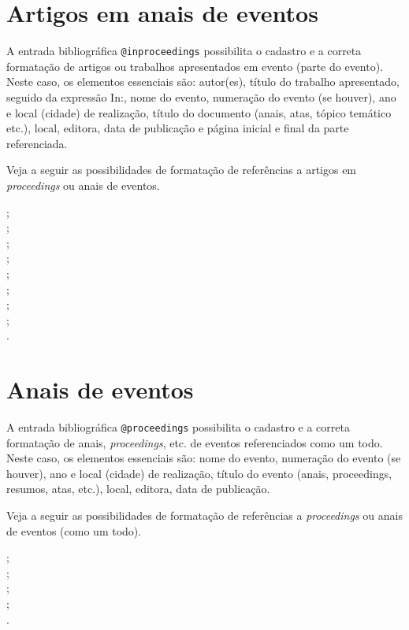 \begin{apendicesenv}
\section{Artigos em anais de eventos}
\label{sec:inproceedings}

A entrada bibliográfica \verb|@inproceedings| possibilita o cadastro e a correta formatação de artigos ou trabalhos apresentados em evento (parte do evento). Neste caso, os elementos essenciais são: autor(es), título do trabalho apresentado, seguido da expressão In:, nome do evento, numeração do evento (se houver), ano e local (cidade) de realização, título do documento (anais, atas, tópico temático etc.), local, editora, data de publicação e página inicial e final da parte referenciada.

Veja a seguir as possibilidades de formatação de referências a artigos em \textit{proceedings} ou anais de eventos.

{\small
    \cite{brayner1994} ;\\
    \cite{Faloutsos1999} ;\\
    \cite{guncho1998} ;\\
    \cite{krzyzanowski1996} ;\\
    \cite{malagrino1985} ;\\
    \cite{martin1997} ;\\
    \cite{oliveira1996} ;\\
    \cite{sabroza1998} ;\\
    \cite{souza1994}.\\
}



\section{Anais de eventos}
\label{sec:proceedings}

A entrada bibliográfica \verb|@proceedings| possibilita o cadastro e a correta formatação de anais, \textit{proceedings}, etc. de  eventos referenciados como um todo. Neste caso, os elementos essenciais são: nome do evento, numeração do evento (se houver), ano e local (cidade) de realização, título do evento (anais, proceedings, resumos, atas, etc.), local, editora, data de publicação.

Veja a seguir as possibilidades de formatação de referências a \textit{proceedings} ou anais de eventos (como um todo).

{\small
    \cite{biblioteconomia1979} ;\\
    \cite{chemical1984} ;\\
    \cite{cientifica1996} ;\\
    \cite{quimica1997} ;\\
    \cite{redes1995}.\\
}




\end{apendicesenv}
